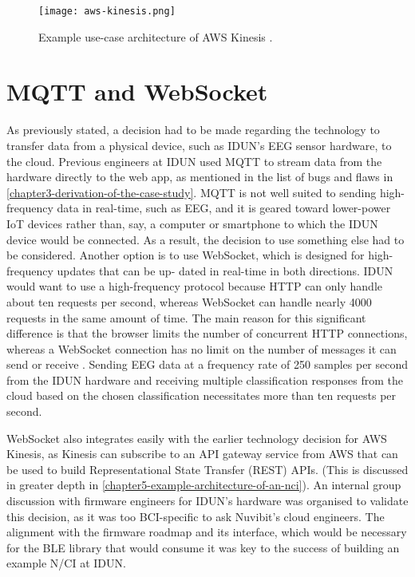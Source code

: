 \begin{figure}[!ht]
  \centering
  \texttt{[image: aws-kinesis.png]}
  \caption[Example use-case architecture of AWS Kinesis]{Example use-case architecture of AWS Kinesis \citep{amazon_web_services_inc_amazon_nodate}.}
  \label{fig:aws-kinesis}
\end{figure}

\section*{MQTT and WebSocket}
\label{chapter4-mqtt-and-websocket}

As previously stated, a decision had to be made regarding the technology to transfer data from a physical device, such as IDUN’s EEG sensor hardware, to the cloud. Previous engineers at IDUN used MQTT to stream data from the hardware directly to the web app, as mentioned in the list of bugs and flaws in \autoref{chapter3-derivation-of-the-case-study}. MQTT is not well suited to sending high-frequency data in real-time, such as EEG, and it is geared toward lower-power IoT devices rather than, say, a computer or smartphone to which the IDUN device would be connected. As a result, the decision to use something else had to be considered. Another option is to use WebSocket, which is designed for high-frequency updates that can be up- dated in real-time in both directions. IDUN would want to use a high-frequency protocol because HTTP can only handle about ten requests per second, whereas WebSocket can handle nearly 4000 requests in the same amount of time. The main reason for this significant difference is that the browser limits the number of concurrent HTTP connections, whereas a WebSocket connection has no limit on the number of messages it can send or receive \citep{luecke_http_2018}. Sending EEG data at a frequency rate of 250 samples per second from the IDUN hardware and receiving multiple classification responses from the cloud based on the chosen classification necessitates more than ten requests per second.

WebSocket also integrates easily with the earlier technology decision for AWS Kinesis, as Kinesis can subscribe to an API gateway service from AWS that can be used to build Representational State Transfer (REST) APIs. (This is discussed in greater depth in \autoref{chapter5-example-architecture-of-an-nci}). An internal group discussion with firmware engineers for IDUN’s hardware was organised to validate this decision, as it was too BCI-specific to ask Nuvibit’s cloud engineers. The alignment with the firmware roadmap and its interface, which would be necessary for the BLE library that would consume it was key to the success of building an example N/CI at IDUN.

